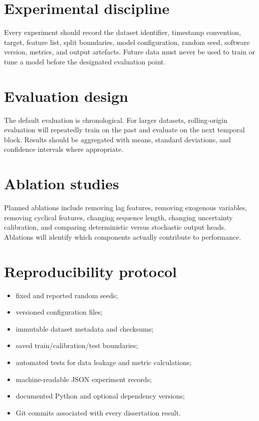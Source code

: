 \documentclass[11pt,a4paper]{report}
\begin{document}
\section{Experimental discipline}
Every experiment should record the dataset identifier, timestamp convention, target, feature list, split boundaries, model configuration, random seed, software version, metrics, and output artefacts. Future data must never be used to train or tune a model before the designated evaluation point.

\section{Evaluation design}
The default evaluation is chronological. For larger datasets, rolling-origin evaluation will repeatedly train on the past and evaluate on the next temporal block. Results should be aggregated with means, standard deviations, and confidence intervals where appropriate.

\section{Ablation studies}
Planned ablations include removing lag features, removing exogenous variables, removing cyclical features, changing sequence length, changing uncertainty calibration, and comparing deterministic versus stochastic output heads. Ablations will identify which components actually contribute to performance.

\section{Reproducibility protocol}
\begin{itemize}[leftmargin=*]
\item fixed and reported random seeds;
\item versioned configuration files;
\item immutable dataset metadata and checksums;
\item saved train/calibration/test boundaries;
\item automated tests for data leakage and metric calculations;
\item machine-readable JSON experiment records;
\item documented Python and optional dependency versions;
\item Git commits associated with every dissertation result.
\end{itemize}
\end{document}
